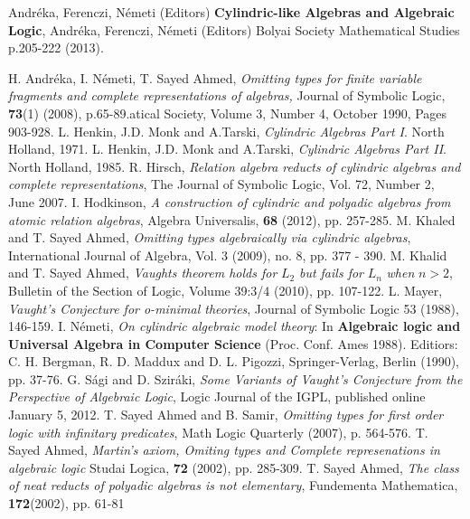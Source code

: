 \documentclass[12pt]{article}
\newcounter{item}[section]
\theoremstyle{definition}
\begin{document}
\begin{thebibliography}{}




 Andr\'eka, Ferenczi, N\'emeti (Editors) {\bf Cylindric-like Algebras and Algebraic Logic},
Andr\'eka, Ferenczi, N\'emeti (Editors) Bolyai Society Mathematical Studies p.205-222 (2013).

H. Andr\'eka, I.  N\'emeti, T. Sayed Ahmed,
{\it Omitting types for finite variable fragments and complete representations of algebras,}
Journal of Symbolic Logic, {\bf 73}(1) (2008), p.65-89.atical Society, Volume 3, Number 4, October 1990, Pages 903-928.
 L. Henkin, J.D. Monk and  A.Tarski, {\it Cylindric Algebras Part I}.
North Holland, 1971.
 L. Henkin, J.D. Monk and  A.Tarski, {\it Cylindric Algebras Part II}.
North Holland, 1985.
 R. Hirsch, {\it Relation algebra reducts of cylindric algebras and complete representations}, The Journal of Symbolic Logic, Vol. 72, Number 2, June 2007.
 I. Hodkinson, \emph{A construction of cylindric and polyadic algebras from atomic relation algebras}, Algebra Universalis, \textbf{68} (2012), pp. 257-285.
 M. Khaled and T. Sayed Ahmed, {\it Omitting types algebraically via cylindric algebras}, International Journal of Algebra, Vol. 3 (2009), no. 8, pp. 377 - 390.
 M. Khalid and T. Sayed Ahmed,  \emph{Vaughts theorem holds for} $L_2$ \emph{but fails for} $L_n$ \emph{when} $n>2$, Bulletin of the Section of Logic, Volume 39:3/4 (2010), pp. 107-122.
 L. Mayer, \emph{Vaught's Conjecture for o-minimal theories}, Journal of Symbolic Logic 53 (1988), 146-159.
 I. N\'emeti, {\it On cylindric algebraic model theory}: In {\bf Algebraic logic and Universal Algebra in Computer Science} (Proc. Conf. Ames 1988). Editiors: C. H. Bergman, R. D. Maddux and D. L. Pigozzi, Springer-Verlag, Berlin (1990), pp. 37-76.
 G. S\'agi and D. Szir\'aki, \emph{Some Variants of Vaught's Conjecture from the Perspective of Algebraic Logic}, Logic Journal of the IGPL, published online January 5, 2012.
 T. Sayed Ahmed and B. Samir, {\it  Omitting types for first order logic with infinitary predicates}, Math Logic Quarterly (2007), p. 564-576.
 T. Sayed Ahmed, {\it Martin's axiom, Omiting types and Complete represenations in algebraic logic} Studai Logica, \textbf{72} (2002), pp. 285-309.
 T. Sayed Ahmed, {\it  The class of neat reducts of polyadic algebras  is not elementary}, Fundementa Mathematica, \textbf{172}(2002), pp. 61-81

\end{thebibliography}
\end{document}
